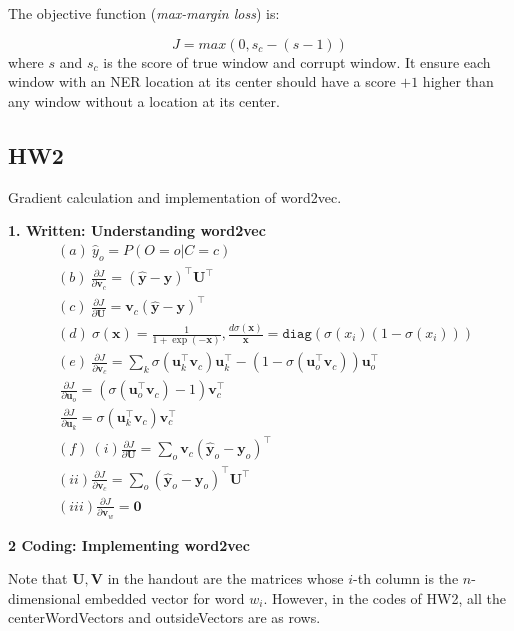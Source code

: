 The objective function (\emph{max-margin loss}) is:

\begin{equation}
J = max(0, s_c - (s - 1))
\end{equation}
where $s$ and $s_c$ is the score of true window and corrupt window.
It ensure each window with an NER location at its center should have a score $+1$ higher than any window without a location at its center.

\subsection{HW2}

Gradient calculation and implementation of word2vec.

\textbf{1. Written: Understanding word2vec}
\begin{align*}
	&(a) \ \hat{y}_o = P(O = o | C = c) \\
	&(b) \ \frac{\partial J}{\partial \bm{v}_c} = (\hat{\bm{y}} - \bm{y})^\top \bm{U}^\top \\
	&(c) \ \frac{\partial J}{\partial \bm{U}} = \bm{v}_c (\hat{\bm{y}} - \bm{y})^\top \\
	&(d) \ \sigma (\bm{x}) = \frac{1}{1 + \exp (- \bm{x})}, \frac{d \sigma (\bm{x})}{\bm{x}} = \texttt{diag} (\sigma (x_i) (1 - \sigma (x_i))) \\
	&(e) \ \frac{\partial J}{\partial \bm{v}_c} = \sum_k \sigma (\bm{u}_k^\top \bm{v}_c) \bm{u}_k^\top - (1 - \sigma (\bm{u}_o^\top \bm{v}_c)) \bm{u}_o^\top \\
	& \ \frac{\partial J}{\partial \bm{u}_o} = (\sigma (\bm{u}_o^\top \bm{v}_c) - 1) \bm{v}_c^\top \\
	& \ \frac{\partial J}{\partial \bm{u}_k} = \sigma (\bm{u}_k^\top \bm{v}_c) \bm{v}_c^\top \\
	&(f) \ (i) \frac{\partial J}{\partial \bm{U}} = \sum_o \bm{v}_c (\hat{\bm{y}}_o - \bm{y}_o)^\top \\
	&(ii) \frac{\partial J}{\partial \bm{v}_c} = \sum_o (\hat{\bm{y}}_o - \bm{y}_o)^\top \bm{U}^\top \\
	&(iii) \frac{\partial J}{\partial \bm{v}_w} = \bm{0}
\end{align*}


\textbf{2 Coding: Implementing word2vec}

Note that $\bm{U}, \bm{V}$ in the handout are the matrices whose $i$-th column is the $n$-dimensional embedded vector for word $w_i$.
However, in the codes of HW2, all the centerWordVectors and outsideVectors are as rows.

